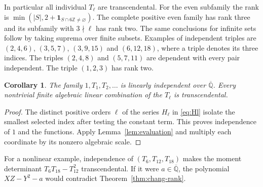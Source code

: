 \documentclass[11pt,a4paper]{article}
\newtheorem{corollary}[theorem]{Corollary}
\theoremstyle{definition}
\theoremstyle{remark}
\newcommand{\Z}{\mathbb Z}
\newcommand{\K}{\overline{\mathbb Q}}
\numberwithin{equation}{section}
\begin{document}
In particular all individual $T_\ell$ are transcendental. For the even subfamily the rank is $\min(|S|,2+\mathbf1_{S\cap6\Z\ne\varnothing})$. The complete positive even family has rank three and its subfamily with $3\nmid\ell$ has rank two. The same conclusions for infinite sets follow by taking suprema over finite subsets. Examples of independent triples are $(2,4,6)$, $(3,5,7)$, $(3,9,15)$ and $(6,12,18)$, where a triple denotes its three indices. The triples $(2,4,8)$ and $(5,7,11)$ are dependent with every pair independent. The triple $(1,2,3)$ has rank two.
\begin{corollary}
The family $1,T_1,T_2,\ldots$ is linearly independent over $\K$. Every nontrivial finite algebraic linear combination of the $T_\ell$ is transcendental.
\end{corollary}
\begin{proof}
The distinct positive orders $\ell$ of the series $H_\ell$ in \eqref{eq:Hl} isolate the smallest selected index after testing the constant term. This proves independence of $1$ and the functions. Apply Lemma~\ref{lem:evaluation} and multiply each coordinate by its nonzero algebraic scale.
\end{proof}
For a nonlinear example, independence of $(T_6,T_{12},T_{18})$ makes the moment determinant $T_6T_{18}-T_{12}^2$ transcendental. If it were $a\in\K$, the polynomial $XZ-Y^2-a$ would contradict Theorem~\ref{thm:chang-rank}.

\appendix
\end{document}
